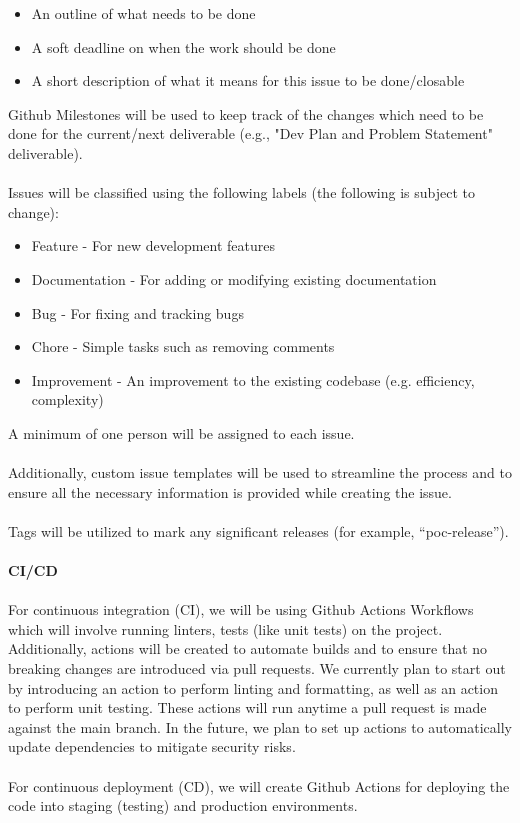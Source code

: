 \documentclass{article}
\begin{document}
\begin{itemize}
\item An outline of what needs to be done
\item A soft deadline on when the work should be done
\item A short description of what it means for this issue to be done/closable
\end{itemize}
Github Milestones will be used to keep track of the changes which need to be done for the current/next
deliverable (e.g., "Dev Plan and Problem Statement" deliverable).\\
\\
Issues will be classified using the following labels (the following is subject to change):
\begin{itemize}
\item Feature - For new development features
\item Documentation - For adding or modifying existing documentation
\item Bug - For fixing and tracking bugs
\item Chore - Simple tasks such as removing comments
\item Improvement - An improvement to the existing codebase (e.g. efficiency, complexity)
\end{itemize}
A minimum of one person will be assigned to each issue.\\
\\
Additionally, custom issue templates will be used to streamline the process and to ensure all the necessary
information is provided while creating the issue.\\
\\
Tags will be utilized to mark any significant releases (for example, “poc-release”).\\
\\
\textbf{CI/CD}\\
\\
For continuous integration (CI), we will be using Github Actions Workflows which will involve running linters,
tests (like unit tests) on the project. Additionally, actions will be created to automate builds and to ensure that
no breaking changes are introduced via pull requests. We currently plan to start out by introducing an action
to perform linting and formatting, as well as an action to perform unit testing. These actions will run anytime a
pull request is made against the main branch. In the future, we plan to set up actions to automatically update
dependencies to mitigate security risks.\\
\\
For continuous deployment (CD), we will create Github Actions for deploying the code into staging (testing)
and production environments.
\end{document}
